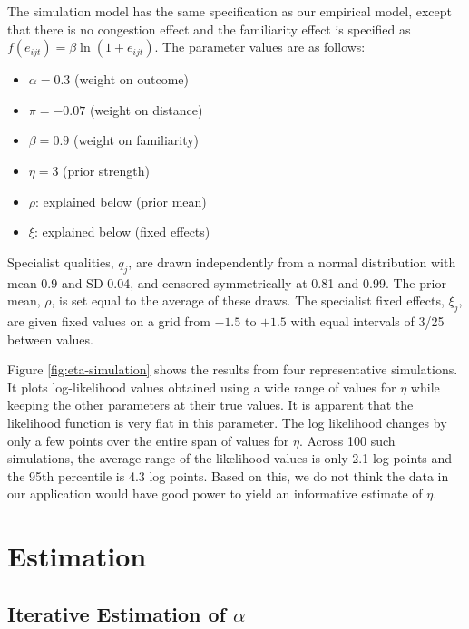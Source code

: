 \documentclass[12pt]{article}
\begin{document}
The simulation model has the same specification as our empirical model, except that there is no congestion effect and the familiarity effect is specified as $f(e_{ijt}) = \beta \ln(1+e_{ijt})$. The parameter values are as follows:
\begin{itemize} \singlespacing
    \item $\alpha = 0.3$ (weight on outcome)
    \item $\pi = -0.07$ (weight on distance)
    \item $\beta = 0.9$ (weight on familiarity)
    \item $\eta = 3$ (prior strength)
    \item $\rho$: explained below (prior mean)
    \item $\xi$: explained below (fixed effects)
\end{itemize}
Specialist qualities, $q_j$, are drawn independently from a normal distribution with mean 0.9 and SD 0.04, and censored symmetrically at 0.81 and 0.99. The prior mean, $\rho$, is set equal to the average of these draws. The specialist fixed effects, $\xi_j$, are given fixed values on a grid from $-1.5$ to $+1.5$ with equal intervals of 3/25 between values.

Figure \ref{fig:eta-simulation} shows the results from four representative simulations. It plots log-likelihood values obtained using a wide range of values for $\eta$ while keeping the other parameters at their true values. It is apparent that the likelihood function is very flat in this parameter. The log likelihood changes by only a few points over the entire span of values for $\eta$. Across 100 such simulations, the average range of the likelihood values is only 2.1 log points and the 95th percentile is 4.3 log points. Based on this, we do not think the data in our application would have good power to yield an informative estimate of $\eta$.





\section{Estimation}
\label{app:estimation}

\subsection{Iterative Estimation of $\alpha$}
\label{app:fader}
\end{document}
